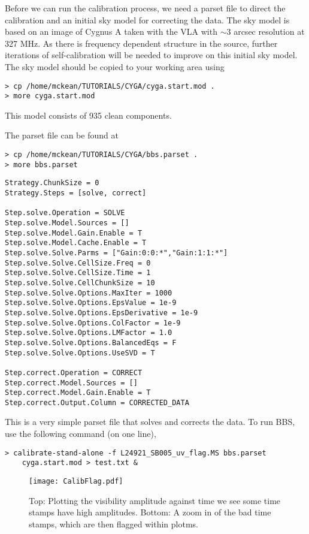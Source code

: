 Before we can run the calibration process, we need a parset file to direct the calibration and an initial sky model for correcting the data. The sky model is based on an image of Cygnus A taken with the VLA with $\sim$3 arcsec resolution at 327 MHz. As there is frequency dependent structure in the source, further iterations of self-calibration will be needed to improve on this initial sky model. The sky model should be copied to your working area using
\begin{verbatim}
> cp /home/mckean/TUTORIALS/CYGA/cyga.start.mod .
> more cyga.start.mod
\end{verbatim}

This model consists of 935 clean components.

The parset file can be found at
\begin{verbatim}
> cp /home/mckean/TUTORIALS/CYGA/bbs.parset .
> more bbs.parset
\end{verbatim}
\begin{lstlisting}
Strategy.ChunkSize = 0
Strategy.Steps = [solve, correct]

Step.solve.Operation = SOLVE
Step.solve.Model.Sources = []
Step.solve.Model.Gain.Enable = T
Step.solve.Model.Cache.Enable = T
Step.solve.Solve.Parms = ["Gain:0:0:*","Gain:1:1:*"]
Step.solve.Solve.CellSize.Freq = 0
Step.solve.Solve.CellSize.Time = 1
Step.solve.Solve.CellChunkSize = 10
Step.solve.Solve.Options.MaxIter = 1000
Step.solve.Solve.Options.EpsValue = 1e-9
Step.solve.Solve.Options.EpsDerivative = 1e-9
Step.solve.Solve.Options.ColFactor = 1e-9
Step.solve.Solve.Options.LMFactor = 1.0
Step.solve.Solve.Options.BalancedEqs = F
Step.solve.Solve.Options.UseSVD = T

Step.correct.Operation = CORRECT
Step.correct.Model.Sources = []
Step.correct.Model.Gain.Enable = T
Step.correct.Output.Column = CORRECTED_DATA
\end{lstlisting}

This is a very simple parset file that solves and corrects the data. To run BBS, use the following command (on one line),
\begin{verbatim}
> calibrate-stand-alone -f L24921_SB005_uv_flag.MS bbs.parset 
    cyga.start.mod > test.txt &
\end{verbatim}


\begin{figure*}[!hb]
\begin{center}
    \texttt{[image: CalibFlag.pdf]}
  \caption{Top: Plotting the visibility amplitude against time we see some time stamps have high amplitudes. Bottom: A zoom in of the bad time stamps, which are then flagged within plotms.}
  \label{ex:calib}
  \end{center}
\end{figure*}

